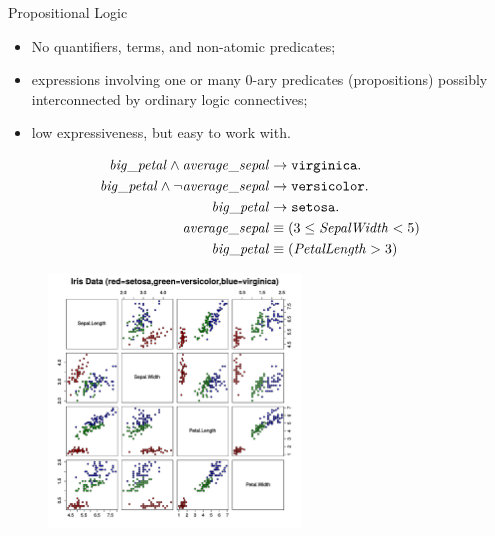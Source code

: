 \documentclass[presentation]{beamer}\mode<presentation>{\usetheme{AMSBolognaFC}}
\begin{document}
\begin{frame}[allowframebreaks]{Propositional Logic}
    \begin{itemize}
        \item No quantifiers, terms, and non-atomic predicates;
        \item expressions involving one or many 0-ary predicates (propositions) possibly interconnected by ordinary logic connectives;
        \item low expressiveness, but easy to work with.
    \end{itemize}
    \centering
    \begin{equation*}
        \begin{aligned}
            \mathit{big\_petal}\wedge\mathit{average\_sepal}&\rightarrow\mathtt{virginica}.\\
            \mathit{big\_petal}\wedge\neg\mathit{average\_sepal}&\rightarrow\mathtt{versicolor}.\\
            \mathit{big\_petal}&\rightarrow\mathtt{setosa}.\\
            \mathit{average\_sepal}&\equiv(3\le\mathit{SepalWidth}<5)\\
            \mathit{big\_petal}&\equiv(\mathit{PetalLength}>3)\\
        \end{aligned}    
    \end{equation*}
    
    \framebreak
    
    \begin{figure}
        \centering
        \includegraphics[width=0.6\textwidth]{figures/iris-dataset}
    \end{figure}
    
\end{frame}
\end{document}
